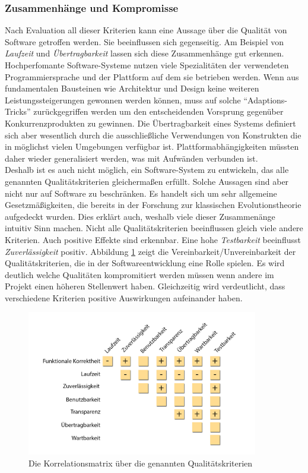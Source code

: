 \subsubsection{Zusammenhänge und Kompromisse} 
Nach Evaluation all dieser Kriterien kann eine Aussage über die Qualität von Software getroffen werden. Sie beeinflussen sich gegenseitig. Am Beispiel von \textit{Laufzeit} und \textit{Übertragbarkeit} lassen sich diese Zusammenhänge gut erkennen. Hochperfomante Software-Systeme nutzen viele Spezialitäten der verwendeten Programmiersprache und der Plattform auf dem sie betrieben werden. Wenn aus fundamentalen Bausteinen wie Architektur und Design keine weiteren Leistungssteigerungen gewonnen werden können, muss auf solche ``Adaptions-Tricks'' zurückgegriffen werden um den entscheidenden Vorsprung gegenüber Konkurrenzprodukten zu gewinnen. Die Übertragbarkeit eines Systems definiert sich aber wesentlich durch die ausschließliche Verwendungen von Konstrukten die in möglichst vielen Umgebungen verfügbar ist. Plattformabhängigkeiten müssten daher wieder generalisiert werden, was mit Aufwänden verbunden ist.\\
Deshalb ist es auch nicht möglich, ein Software-System zu entwickeln, das alle genannten Qualitätskriterien gleichermaßen erfüllt. Solche Aussagen sind aber nicht nur auf Software zu beschränken. Es handelt sich um sehr allgemeine Gesetzmäßigkeiten, die bereits in der Forschung zur klassischen Evolutionstheorie aufgedeckt wurden.\cite{hoffmann_software-qualitat_2013} Dies erklärt auch, weshalb viele dieser Zusammenänge intuitiv Sinn machen. Nicht alle Qualitätskriterien beeinflussen gleich viele andere Kriterien. Auch positive Effekte sind erkennbar. Eine hohe \textit{Testbarkeit} beeinflusst \textit{Zuverlässigkeit} positiv. Abbildung \ref{fig:korrelationsmatrix} zeigt die Vereinbarkeit/Unvereinbarkeit der Qualitätskriterien, die in der Softwareentwicklung eine Rolle spielen. Es wird deutlich welche Qualitäten kompromitiert werden müssen wenn andere im Projekt einen höheren Stellenwert haben. Gleichzeitig wird verdeutlicht, dass verschiedene Kriterien positive Auswirkungen aufeinander haben.

\begin{figure}[h] 
  \centering
     \includegraphics[width=0.9\textwidth]{figures/korrelationsmatrix.png}
  \caption{Die Korrelationsmatrix über die genannten Qualitätskriterien\cite{hoffmann_software-qualitat_2013}}
  \label{fig:korrelationsmatrix}
\end{figure}

